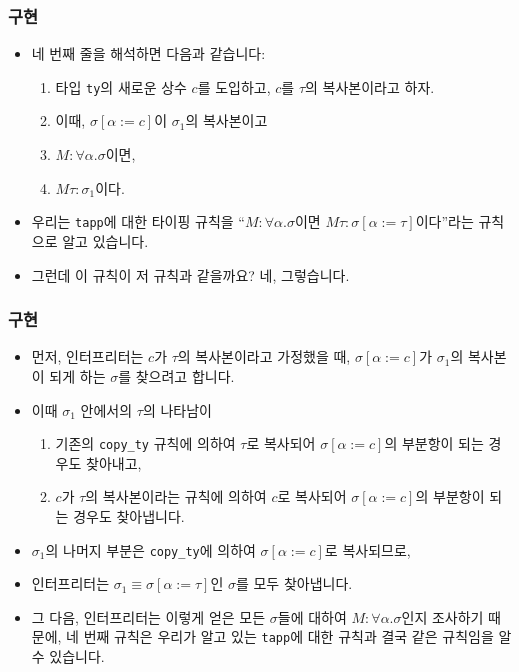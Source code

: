 \documentclass[slidestop,compress,mathserif]{beamer}
\begin{document}
    \begin{frame}
        \frametitle{구현}
        \begin{itemize}
            \item 네 번째 줄을 해석하면 다음과 같습니다:
            \begin{enumerate}
                \item 타입 \texttt{ty}의 새로운 상수 $c$를 도입하고, $c$를 $\tau$의 복사본이라고 하자.
                \item 이때, $\sigma \left[ \alpha := c \right]$이 $\sigma_1$의 복사본이고
                \item $M : \forall \alpha . \sigma$이면,
                \item $M \tau : \sigma_1$이다. 
            \end{enumerate}
            \item 우리는 \texttt{tapp}에 대한 타이핑 규칙을 ``$M : \forall \alpha . \sigma$이면 $M \tau : \sigma \left[ \alpha := \tau \right]$이다''라는 규칙으로 알고 있습니다.
            \item 그런데 이 규칙이 저 규칙과 같을까요? 네, 그렇습니다.
        \end{itemize}
    \end{frame}

    \begin{frame}
        \frametitle{구현}
        \begin{itemize}
            \item 먼저, 인터프리터는 $c$가 $\tau$의 복사본이라고 가정했을 때, $\sigma \left[ \alpha := c \right]$가 $\sigma_1$의 복사본이 되게 하는 $\sigma$를 찾으려고 합니다.
            \item 이때 $\sigma_1$ 안에서의 $\tau$의 나타남이
            \begin{enumerate}
                \item 기존의 \texttt{copy\_ty} 규칙에 의하여 $\tau$로 복사되어 $\sigma \left[ \alpha := c \right]$의 부분항이 되는 경우도 찾아내고,
                \item $c$가 $\tau$의 복사본이라는 규칙에 의하여 $c$로 복사되어 $\sigma \left[ \alpha := c \right]$의 부분항이 되는 경우도 찾아냅니다.
            \end{enumerate}
            \item $\sigma_1$의 나머지 부분은 \texttt{copy\_ty}에 의하여 $\sigma \left[ \alpha := c \right]$로 복사되므로,
            \item 인터프리터는 $\sigma_1 \equiv \sigma \left[ \alpha := \tau \right]$인 $\sigma$를 모두 찾아냅니다.
            \item 그 다음, 인터프리터는 이렇게 얻은 모든 $\sigma$들에 대하여 $M : \forall \alpha . \sigma$인지 조사하기 때문에, 네 번째 규칙은 우리가 알고 있는 \texttt{tapp}에 대한 규칙과 결국 같은 규칙임을 알 수 있습니다.
        \end{itemize}
    \end{frame}
\end{document}
